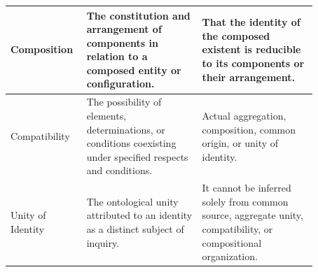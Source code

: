 \begin{table}[htbp]
\begin{tabular}{
    |p{0.17\linewidth}
    |p{0.35\linewidth}
    |p{0.35\linewidth}|
}
Composition
&
The constitution and arrangement of components
in relation to a composed entity or configuration.
&
That the identity of the composed existent
is reducible to its components or their arrangement.
\\
\hline

Compatibility
&
The possibility of elements, determinations,
or conditions coexisting under specified
respects and conditions.
&
Actual aggregation, composition, common origin,
or unity of identity.
\\
\hline

Unity of Identity
&
The ontological unity attributed to an identity
as a distinct subject of inquiry.
&
It cannot be inferred solely from common source,
aggregate unity, compatibility, or compositional
organization.
\\
\hline

\end{tabular}
\end{table}


